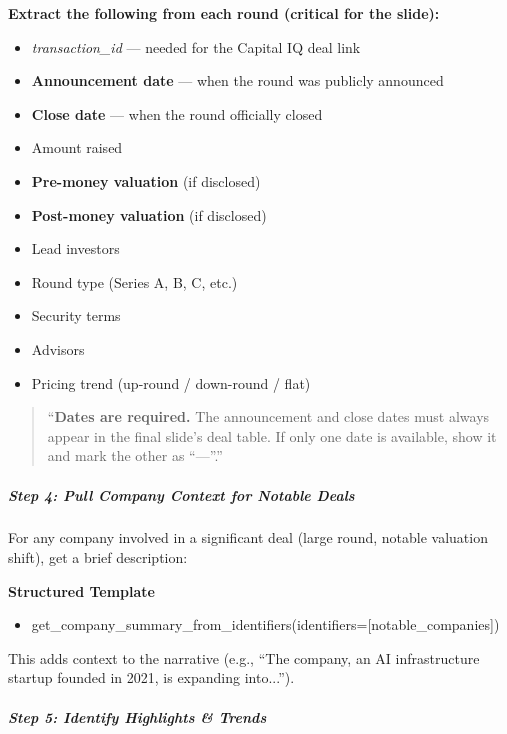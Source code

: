 \documentclass[11pt]{article}
\begin{document}
\textbf{Extract the following from each round (critical for the slide):}

\begin{itemize}[leftmargin=*,itemsep=2pt,topsep=2pt]
\item {} \emph{transaction\_\allowbreak{}id} — needed for the Capital IQ deal link
\item {} \textbf{Announcement date} — when the round was publicly announced
\item {} \textbf{Close date} — when the round officially closed
\item {} Amount raised
\item {} \textbf{Pre-money valuation} (if disclosed)
\item {} \textbf{Post-money valuation} (if disclosed)
\item {} Lead investors
\item {} Round type (Series A, B, C, etc.)
\item {} Security terms
\item {} Advisors
\item {} Pricing trend (up-round / down-round / flat)
\end{itemize}

\begin{quote}
``\textbf{Dates are required.} The announcement and close dates must always appear in the final slide's deal table. If only one date is available, show it and mark the other as ``—''.''
\end{quote}

\subparagraph{Step 4: Pull Company Context for Notable Deals}\mbox{}\par

For any company involved in a significant deal (large round, notable valuation shift), get a brief description:


\textbf{Structured Template}
\begin{itemize}[leftmargin=*,itemsep=2pt,topsep=2pt]
\item {} get\_\allowbreak{}company\_\allowbreak{}summary\_\allowbreak{}from\_\allowbreak{}identifiers(identifiers=[notable\_\allowbreak{}companies])
\end{itemize}

This adds context to the narrative (e.g., ``The company, an AI infrastructure startup founded in 2021, is expanding into...'').


\subparagraph{Step 5: Identify Highlights \& Trends}\mbox{}\par
\end{document}
